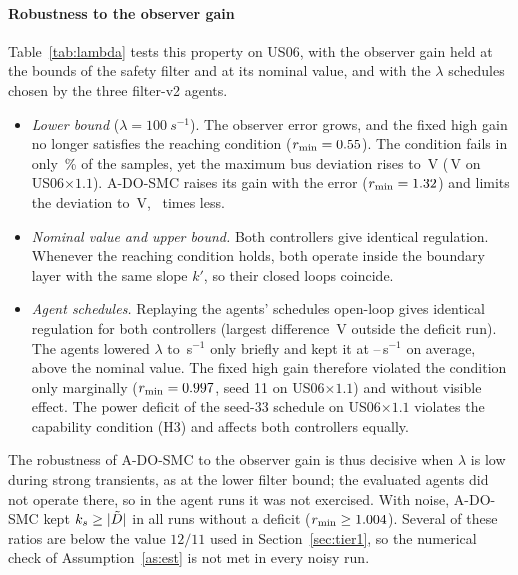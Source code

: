 \paragraph{Robustness to the observer gain}

Table~\ref{tab:lambda} tests this property on US06, with the observer gain held at the bounds of the safety filter and at its nominal value, and with the $\lambda$ schedules chosen by the three filter-v2 agents.
\begin{itemize}
\item \emph{Lower bound} ($\lambda=\SI{100}{s^{-1}}$). The observer error grows, and the fixed high gain no longer satisfies the reaching condition ($r_{\min}=0.55$). The condition fails in only \LamHiUSFail\,\% of the samples, yet the maximum bus deviation rises to \LamHiUSMax\,V (\LamHiUSbMax\,V on US06$\times1.1$). A-DO-SMC raises its gain with the error ($r_{\min}=1.32$) and limits the deviation to \LamAUSMax\,V, \LamFactorHi\ times less.
\item \emph{Nominal value and upper bound.} Both controllers give identical regulation. Whenever the reaching condition holds, both operate inside the boundary layer with the same slope $k'$, so their closed loops coincide.
\item \emph{Agent schedules.} Replaying the agents' schedules open-loop gives identical regulation for both controllers (largest difference \LamAgentMaxDiff\,V outside the deficit run). The agents lowered $\lambda$ to \LamAgentMin\,s$^{-1}$ only briefly and kept it at \LamAgentMeanLo--\LamAgentMeanHi\,s$^{-1}$ on average, above the nominal value. The fixed high gain therefore violated the condition only marginally ($r_{\min}=0.997$, seed 11 on US06$\times1.1$) and without visible effect. The power deficit of the seed-33 schedule on US06$\times1.1$ violates the capability condition (H3) and affects both controllers equally.
\end{itemize}
The robustness of A-DO-SMC to the observer gain is thus decisive when $\lambda$ is low during strong transients, as at the lower filter bound; the evaluated agents did not operate there, so in the agent runs it was not exercised. With noise, A-DO-SMC kept $k_s\ge|\tilde{D}|$ in all runs without a deficit ($r_{\min}\ge1.004$). Several of these ratios are below the value $12/11$ used in Section~\ref{sec:tier1}, so the numerical check of Assumption~\ref{as:est} is not met in every noisy run.

